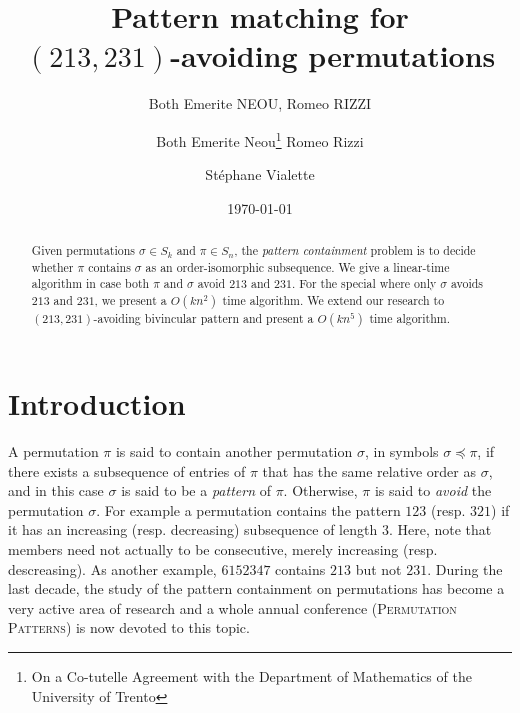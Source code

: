 \documentclass[a4paper]{llncs}
\begin{document}

\title{Pattern matching for\\ $(213,231)$-avoiding permutations}
\author{Both Emerite NEOU, Romeo RIZZI}
\date{}

\author{%
	Both Emerite Neou\thanks{On a Co-tutelle  Agreement with the Department of Mathematics of the University of Trento}
  Romeo Rizzi \and
  St\'ephane Vialette
}%

\date{\today}

\maketitle

\begin{abstract}
	Given permutations $\sigma \in S_k$ and $\pi \in S_n$, the
  \emph{pattern containment} problem is to decide whether $\pi$ contains
  $\sigma$ as an order-isomorphic subsequence.
	We give a linear-time algorithm in case both $\pi$ and $\sigma$ avoid
	$213$ and $231$.
	For the special where only $\sigma$ avoids $213$ and $231$, we present a
	$O(kn^2)$ time algorithm. We extend our research to $(213,231)$-avoiding
	bivincular pattern and present a $O(kn^5)$ time algorithm.
\end{abstract}



\section{Introduction}
\label{section:Introduction}

	A permutation $\pi$ is said to contain another permutation $\sigma$,
	in symbols $\sigma \preceq \pi$,
	if there exists a subsequence of entries of $\pi$ that has the same relative
	order as $\sigma$, and in this case $\sigma$ is said to be a
	\emph{pattern} of $\pi$.
	Otherwise, $\pi$ is said to \emph{avoid} the permutation $\sigma$.
	For example a permutation contains the pattern $123$ (resp. $321$) if it has
	an increasing (resp. decreasing) subsequence of length $3$.
	Here, note that members need not actually to be consecutive,
	merely increasing (resp. descreasing).
	As another example,
	$6152347$ contains $213$ but not $231$.
	During the last decade, the study of the pattern containment on permutations has
	become a very active area of research and
	a whole annual conference (\textsc{Permutation Patterns}) is now devoted
	to this topic.
\end{document}
